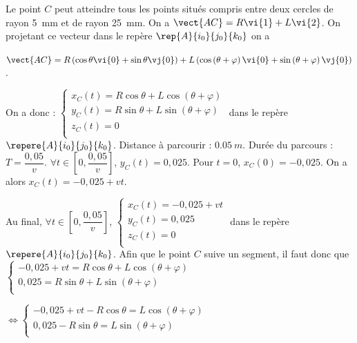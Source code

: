 \begin{corrigebox}
Le point $C$ peut atteindre tous les points situés compris entre deux cercles de rayon \SI{5}{mm} et de rayon \SI{25}{mm}.
On  a $\vect{AC}=R\vi{1}+L\vi{2}$. On projetant ce vecteur dans le repère $\rep{A}{i_0}{j_0}{k_0}$ on a 

$\vect{AC}=R\left(\cos\theta \vi{0} + \sin\theta \vj{0}\right) +L\left(\cos\left(\theta+\varphi\right) \vi{0} + \sin\left(\theta+\varphi\right) \vj{0}\right)$. 

On a donc :
$\left\{
\begin{array}{l}
x_C(t)= R\cos\theta  +L\cos\left(\theta+\varphi\right)  \\
y_C(t)= R \sin\theta + L\sin\left(\theta+\varphi\right)\\
z_C(t)= 0\\
\end{array}
\right.
$ dans le repère $\repere{A}{i_0}{j_0}{k_0}$.
Distance à parcourir : $\SI{0,05}{m}$. Durée du parcours : $T=\dfrac{0,05}{v}$.
$\forall t \in \left[0,\dfrac{0,05}{v}\right]$, $y_C(t)=0,025$. 
Pour $t=0$, $x_C(0)=-0,025$. On a alors $x_C(t)=-0,025+vt$.  

Au final, $\forall t \in \left[0,\dfrac{0,05}{v}\right]$, $\left\{
\begin{array}{l}
x_C(t)= -0,025+vt\\
y_C(t)= 0,025\\
z_C(t)= 0\\
\end{array}
\right.
$ dans le repère $\repere{A}{i_0}{j_0}{k_0}$.
Afin que le point $C$ suive un segment, il faut donc que 
$\left\{
\begin{array}{l}
-0,025+vt= R\cos\theta  +L\cos\left(\theta+\varphi\right)  \\
0,025 = R \sin\theta + L\sin\left(\theta+\varphi\right)\\
\end{array}
\right.
$

$\Leftrightarrow 
\left\{
\begin{array}{l}
-0,025+vt- R\cos\theta  =L\cos\left(\theta+\varphi\right)  \\
0,025 - R \sin\theta  = L\sin\left(\theta+\varphi\right)\\
\end{array}
\right.
$


\end{corrigebox}
